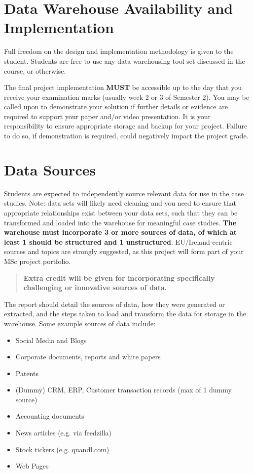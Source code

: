 \documentclass{article}[a4paper,12pt]
\begin{document}
\section{Data Warehouse Availability and Implementation}
Full freedom on the design and implementation methodology is given to the student. Students are free to use any data warehousing tool set discussed in the course, or otherwise. 

The final project implementation \textbf{MUST} be accessible up to the day that you receive your examination marks (usually week 2 or 3 of Semester 2). You may be called upon to demonstrate your solution if further details or evidence are required to support your paper and/or video presentation. It is your responsibility to ensure appropriate storage and backup for your project. Failure to do so, if demonstration is required, could negatively impact the project grade. 

\section{Data Sources}
Students are expected to independently source relevant data for use in the case studies. Note: data sets will likely need cleaning and you need to ensure that appropriate relationships exist between your data sets, such that they can be transformed and loaded into the warehouse for meaningful case studies. \textbf{The warehouse must incorporate 3 or more sources of data, of which at least 1 should be structured and 1 unstructured}. EU/Ireland-centric sources and topics are strongly suggested, as this project will form part of your MSc project portfolio.  

\begin{quote}
\centering
\large{\textbf{Extra credit will be given for incorporating specifically challenging or innovative sources of data.}}
\end{quote}

The report should detail the sources of data, how they were generated or extracted, and the steps taken to load and transform the data for storage in the warehouse. Some example sources of data include:
\begin{itemize}
\item Social Media and Blogs
\item Corporate documents, reports and white papers
\item Patents
\item (Dummy) CRM, ERP, Customer transaction records (max of 1 dummy source)
\item Accounting documents
\item News articles (e.g. via feedzilla)
\item Stock tickers (e.g. quandl.com)
\item Web Pages
\end{itemize}
\end{document}
